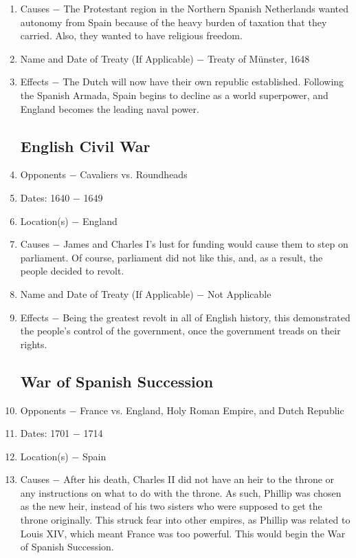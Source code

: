 \documentclass[12pt]{article}
\begin{document}
\begin{enumerate}
\item Causes $-$ The Protestant region in the Northern Spanish Netherlands wanted autonomy from Spain because of the heavy burden of taxation that they carried. Also, they wanted to have religious freedom. 

\item Name and Date of Treaty (If Applicable) $-$ Treaty of M\"unster, 1648

\item Effects $-$ The Dutch will now have their own republic established. Following the Spanish Armada, Spain begins to decline as a world superpower, and England becomes the leading naval power.

\subsection{English Civil War}

\item Opponents $-$ Cavaliers vs. Roundheads

\item Dates: 1640 $-$ 1649

\item Location(s) $-$ England

\item Causes $-$ James and Charles I's lust for funding would cause them to step on parliament. Of course, parliament did not like this, and, as a result, the people decided to revolt.

\item Name and Date of Treaty (If Applicable) $-$ Not Applicable

\item Effects $-$ Being the greatest revolt in all of English history, this demonstrated the people's control of the government, once the government treads on their rights.

\subsection{War of Spanish Succession}
 
\item Opponents $-$ France vs. England, Holy Roman Empire, and Dutch Republic

\item Dates: 1701 $-$ 1714

\item Location(s) $-$ Spain

\item Causes $-$ After his death, Charles II did not have an heir to the throne or any instructions on what to do with the throne. As such, Phillip was chosen as the new heir, instead of his two sisters who were supposed to get the throne originally. This struck fear into other empires, as Phillip was related to Louis XIV, which meant France was too powerful. This would begin the War of Spanish Succession.


\end{enumerate}
\end{document}
